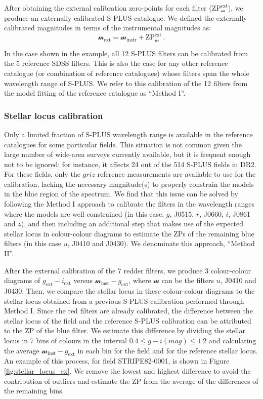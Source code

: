 \documentclass[fleqn,usenatbib]{mnras}
\begin{document}
After obtaining the external calibration zero-points for each filter ($\mathrm{ZP}_\mathcal{m}^\mathrm{ext}$), we produce an externally calibrated S-PLUS catalogue. We defined the externally calibrated magnitudes in terms of the instrumental magnitudes as:
\begin{equation}
    \mathcal{m}_{\mathrm{ext}} = \mathcal{m}_{\mathrm{instr}} + \mathrm{ZP}_\mathcal{m}^{\mathrm{ext}} \,.
\end{equation}

In the case shown in the example, all 12 S-PLUS filters can be calibrated from the 5 reference SDSS filters. This is also the case for any other reference catalogue (or combination of reference catalogues) whose filters span the whole wavelength range of S-PLUS. We refer to this calibration of the 12 filters from the model fitting of the reference catalogue as ``Method I''. 

\subsubsection{Stellar locus calibration} 
\label{sec:stellar_locus_calibration}

Only a limited fraction of S-PLUS wavelength range is available in the reference catalogues for some particular fields. This situation is not common given the large number of wide-area surveys currently available, but it is frequent enough not to be ignored: for instance, it affects 24 out of the 514 S-PLUS fields in DR2. For these fields, only the $griz$ reference measurements are available to use for the calibration, lacking the necessary magnitude(s) to properly constrain the models in the blue region of the spectrum. We find that this issue can be solved by following the Method I approach to calibrate the filters in the wavelength ranges where the models are well constrained (in this case, $g$, J0515, $r$, J0660, $i$, J0861 and $z$), and then including an additional step that makes use of the expected stellar locus in colour-colour diagrams to estimate the ZPs of the remaining blue filters (in this case $u$, J0410 and J0430). We denominate this approach, ``Method II''.

After the external calibration of the 7 redder filters, we produce 3 colour-colour diagrams of $g_\mathrm{ext} - i_\mathrm{ext}$ versus $\mathcal{m}_\mathrm{inst} - g_\mathrm{ext}$, where $\mathcal{m}$ can be the filters $u$, J0410 and J0430. Then, we compare the stellar locus in these colour-colour diagrams to the stellar locus obtained from a previous S-PLUS calibration performed through Method I. Since the red filters are already calibrated, the difference between the stellar locus of the field and the reference S-PLUS calibration can be attributed to the ZP of the blue filter. We estimate this difference by dividing the stellar locus in 7 bins of colours in the interval $0.4 \le g - i (mag) \le 1.2$ and calculating the average $\mathcal{m}_\mathrm{inst} - g_\mathrm{ext}$ in each bin for the field and for the reference stellar locus. An example of this process, for field STRIPE82-0001, is shown in Figure \ref{fig:stellar_locus_ex}. We remove the lowest and highest difference to avoid the contribution of outliers and estimate the ZP from the average of the differences of the remaining bins.
\end{document}
